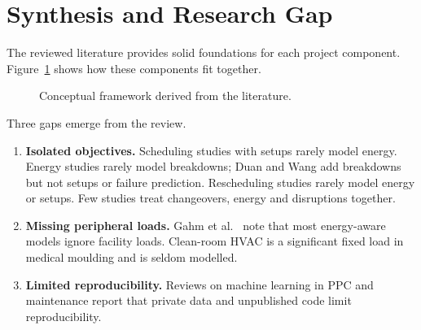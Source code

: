 \documentclass[11pt,a4paper]{article}
\begin{document}
\section{Synthesis and Research Gap}
\label{sec:synthesis}
The reviewed literature provides solid foundations for each project component. Figure~\ref{fig:concept} shows how these components fit together.

\begin{figure}[H]
\centering
{}
\caption{Conceptual framework derived from the literature.}
\label{fig:concept}
\end{figure}

Three gaps emerge from the review.
\begin{enumerate}
  \item \textbf{Isolated objectives.} Scheduling studies with setups \cite{allahverdi2008} rarely model energy. Energy studies \cite{mouzon2007,gahm2016} rarely model breakdowns; Duan and Wang \cite{duan2021} add breakdowns but not setups or failure prediction. Rescheduling studies \cite{vieira2003,ouelhadj2009} rarely model energy or setups. Few studies treat changeovers, energy and disruptions together.
  \item \textbf{Missing peripheral loads.} Gahm et al.\ \cite{gahm2016} note that most energy-aware models ignore facility loads. Clean-room HVAC is a significant fixed load in medical moulding and is seldom modelled.
  \item \textbf{Limited reproducibility.} Reviews on machine learning in PPC and maintenance \cite{usuga2020,carvalho2019} report that private data and unpublished code limit reproducibility.
\end{enumerate}
\end{document}
